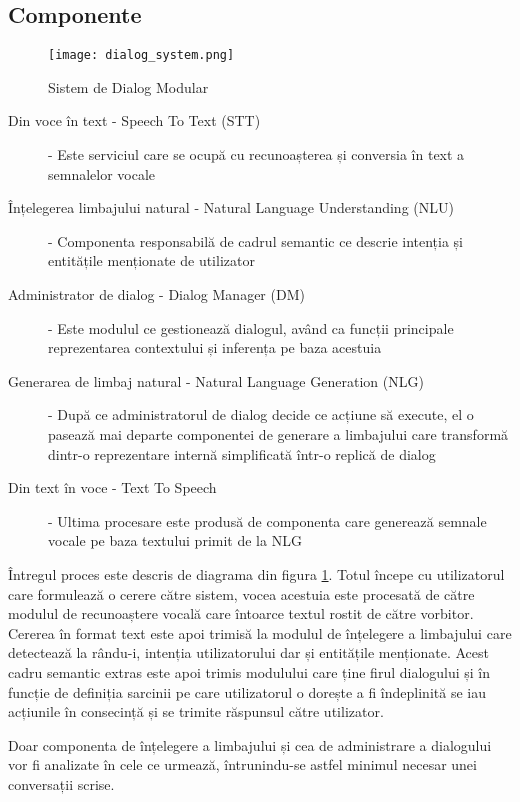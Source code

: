 \subsection{Componente}
\begin{figure}[h]
	\centering
	\texttt{[image: dialog\_system.png]}
	\caption{Sistem de Dialog Modular}
	\label{fig:ds_proc}
\end{figure}
\begin{description}
	\item[Din voce în text - Speech To Text (STT)]  - 
	Este serviciul care se ocupă cu recunoașterea și conversia în text a semnalelor vocale
	\item[Înțelegerea limbajului natural - Natural Language Understanding (NLU)] -
	Componenta responsabilă de cadrul semantic ce descrie intenția și entitățile menționate de utilizator
	\item[Administrator de dialog - Dialog Manager (DM)] - 
	Este modulul ce gestionează dialogul, având ca funcții principale reprezentarea contextului și inferența pe baza acestuia
	\item[Generarea de limbaj natural - Natural Language Generation (NLG)] -
	După ce administratorul de dialog decide ce acțiune să execute, el o pasează mai departe componentei de generare a limbajului care transformă dintr-o reprezentare internă simplificată într-o replică de dialog
	\item[Din text în voce - Text To Speech] - 
	Ultima procesare este produsă de componenta care generează semnale vocale pe baza textului primit de la NLG
\end{description}

Întregul proces este descris de diagrama din figura \ref{fig:ds_proc}. Totul începe cu utilizatorul care formulează o cerere către sistem, vocea acestuia este procesată de către modulul de recunoaștere vocală care întoarce textul rostit de către vorbitor. Cererea în format text este apoi trimisă la modulul de înțelegere a limbajului care detectează la rându-i, intenția utilizatorului dar și entitățile menționate. Acest cadru semantic extras este apoi trimis modulului care ține firul dialogului și în funcție de definiția sarcinii pe care utilizatorul o dorește a fi îndeplinită se iau acțiunile în consecință și se trimite răspunsul către utilizator.

Doar componenta de înțelegere a limbajului și cea de administrare a dialogului vor fi analizate în cele ce urmează, întrunindu-se astfel minimul necesar unei conversații scrise.